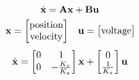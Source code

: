 \begin{theorem}
  \begin{equation*}
    \dot{\mathbf{x}} = \mathbf{A}\mathbf{x} + \mathbf{B}\mathbf{u}
  \end{equation*}
  \begin{equation*}
    \begin{array}{cc}
    \mathbf{x} =
      \begin{bmatrix}
        \text{position} \\
        \text{velocity}
      \end{bmatrix} &
    \mathbf{u} =
      \begin{bmatrix}
        \text{voltage}
      \end{bmatrix}
    \end{array}
  \end{equation*}
  \begin{equation}
    \dot{\mathbf{x}} =
      \begin{bmatrix}
        0 & 1 \\
        0 & -\frac{K_v}{K_a}
      \end{bmatrix}
      \mathbf{x} +
      \begin{bmatrix}
        0 \\
        \frac{1}{K_a}
      \end{bmatrix}
      \mathbf{u}
  \end{equation}
\end{theorem}
